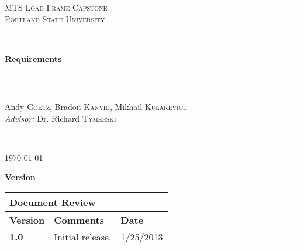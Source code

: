 \documentclass{article}
\newcommand{\HRule}{\rule{\linewidth}{0.5mm}}
\begin{document}
\newenvironment{frcseries}{\fontfamily{frc}\selectfont}{}
\newcommand{\textfrc}[1]{{\frcseries#1}}
\newcommand{\mathfrc}[1]{\text{\textfrc{#1}}}

\setcounter{tocdepth}{2}

\begin{titlepage}
 
\begin{center}
 
 
\textsc{\LARGE MTS Load Frame Capstone}\\[1.5cm]
 
\textsc{\Large Portland State University}\\[0.5cm]
 
 
\HRule \\[0.4cm]
{ \huge \bfseries Requirements}\\[0.4cm]
 
\HRule \\[1.5cm]
 
\begin{minipage}{0.4\textwidth}
\begin{center} \large
Andy \textsc{Goetz}, Bradon \textsc{Kanyid}, Mikhail \textsc{Kulakevich}\\
\hspace{3\textheight}
\emph{Advisor:} Dr. Richard \textsc{Tymerski}
\end{center}
\end{minipage}

 

 
 
\end{center}
\vfill
{ \textit{} }\\[4.0cm]
\begin{center}
{\large \today}

\end{center} 
\end{titlepage}

\newpage

\textbf{\large Version}
\vspace{.1in}

\begin{tabular}{|p{1in}|p{4in}|p{1in}|}
\hline
\multicolumn{3}{|l|}{\textbf{Document Review}} \\ 
\hline
\textbf{Version}& \textbf{Comments} & \textbf{Date} \\ 
\hline
\textbf{1.0} & Initial release. & 1/25/2013 \\
\hline
\end{tabular}
\end{document}
